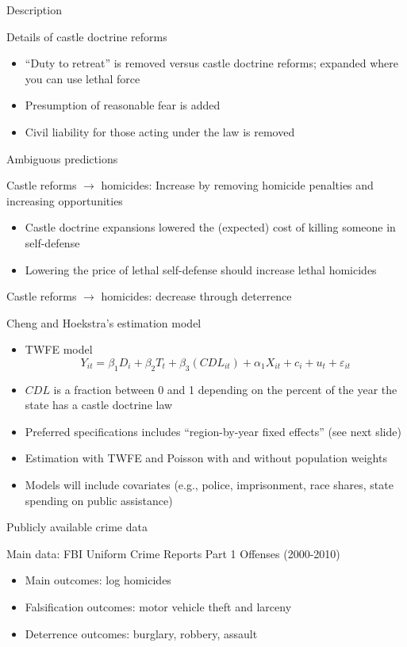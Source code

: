 \documentclass{beamer}
\begin{document}
\begin{frame}{Description}

Details of castle doctrine reforms
		\begin{itemize}
		\item ``Duty to retreat'' is removed versus castle doctrine reforms; expanded where you can use lethal force
		\item Presumption of reasonable fear is added
		\item Civil liability for those acting under the law is removed
		\end{itemize}
\end{frame}

\begin{frame}{Ambiguous predictions}
	
Castle reforms $\rightarrow$ homicides: Increase by removing homicide penalties and increasing opportunities
	\begin{itemize}
	\item Castle doctrine expansions lowered the (expected) cost of killing someone in self-defense
	\item Lowering the price of lethal self-defense should increase lethal homicides
	\end{itemize}
\bigskip
Castle reforms $\rightarrow$ homicides: decrease through deterrence

\end{frame}


\begin{frame}{Cheng and Hoekstra's estimation model}
	
	\begin{itemize}
	\item TWFE model$$Y_{it} = \beta_1 D_i + \beta_2 T_t + \beta_3 (CDL_{it}) + \alpha_1X_{it} + c_i + u_t + \varepsilon_{it}$$
	\item $CDL$ is a fraction between 0 and 1 depending on the percent of the year the state has a castle doctrine law 
	\item Preferred specifications includes ``region-by-year fixed effects'' (see next slide)
	\item Estimation with TWFE and Poisson with and without population weights
	\item Models will include covariates (e.g., police, imprisonment, race shares, state spending on public assistance)
	\end{itemize}
\end{frame}


\begin{frame}{Publicly available crime data}
	
Main data: FBI Uniform Crime Reports Part 1 Offenses (2000-2010)
		\begin{itemize}
		\item Main outcomes: log homicides
		\item Falsification outcomes: motor vehicle theft and larceny
		\item Deterrence outcomes: burglary, robbery, assault
		\end{itemize}
\end{frame}
\end{document}
